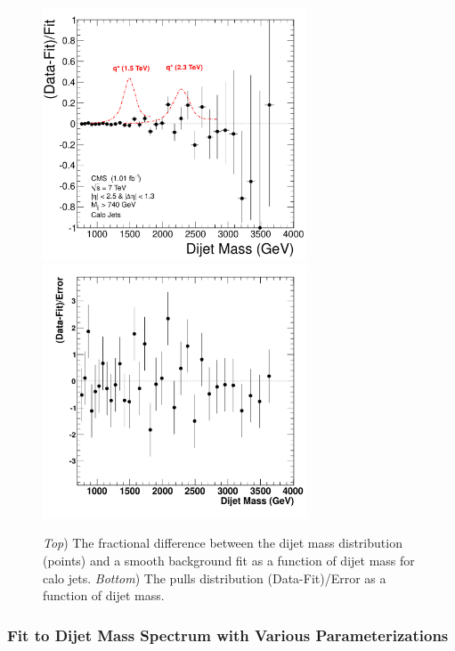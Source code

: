 \begin{figure}[!ht]
  \begin{center}
    \includegraphics[width=0.7\textwidth]{Figures/Fractional_Diff_calo.pdf}
    \includegraphics[width=0.7\textwidth]{Figures/Pulls_calo.pdf}
    \caption{ \textit{Top}) The fractional difference between the
dijet mass distribution (points) and a smooth background fit as a
function of dijet mass for calo jets. \textit{Bottom}) The pulls distribution
(Data-Fit)/Error as a function of dijet mass.}
    \label{FracDiff_calo}
  \end{center}
\end{figure}

\clearpage
\subsubsection{Fit to Dijet Mass Spectrum with Various Parameterizations}
\label{sectionParam}

